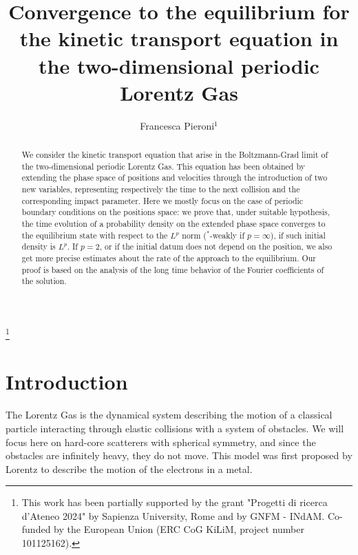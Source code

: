 \documentclass[a4paper,10pt,reqno]{amsart}
\numberwithin{equation}{subsection}
\numberwithin{figure}{subsection}
\begin{document}
\title[]
{
Convergence to the equilibrium for the kinetic transport equation in the two-dimensional periodic Lorentz Gas
}

\author[F. Pieroni]{Francesca Pieroni$^1$}
\address{$^1$ Dipartimento di Matematica, Sapienza Universit\`a di Roma, 00185 Roma, Italia.}
\thanks{This work has been partially supported by the grant "Progetti di ricerca d'Ateneo 2024" by Sapienza University, Rome and by GNFM - INdAM. Co-funded by the European Union (ERC CoG KiLiM, project number 101125162).}


\begin{abstract} 
We consider the kinetic transport equation that arise in the Boltzmann-Grad limit of the two-dimensional periodic Lorentz Gas. This equation has been obtained by extending the phase space of positions and velocities through the introduction of two new variables, representing respectively the time to the next collision and the corresponding impact parameter. Here we mostly focus on the case of periodic boundary conditions on the positions space: we prove that, under suitable hypothesis, the time evolution of a probability density on the extended phase space converges to the equilibrium state with respect to the $L^p$ norm ($^*$-weakly if $p=\infty$), if such initial density is $L^p$. If $p=2$, or if the initial datum does not depend on the position, we also get more precise estimates about the rate of the approach to the equilibrium. Our proof is based on the analysis of the long time behavior of the Fourier coefficients of the solution. 
\end{abstract}

\maketitle

\tableofcontents

\section{Introduction}
The Lorentz Gas is the dynamical system describing the motion of a classical particle interacting through elastic collisions with a system of obstacles. We will focus here on hard-core scatterers with spherical symmetry, and since the obstacles are infinitely heavy, they do not move. This model was first proposed by Lorentz \cite{Lorentz1905} to describe the motion of the electrons in a metal.
\end{document}

